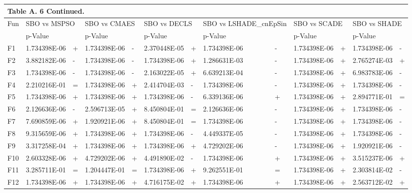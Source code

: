 \documentclass{article} %
\begin{document}
\begin{tabular}{|p{0.3in}|p{0.6in}|p{0.2in}|p{0.6in}|p{0.2in}|p{0.6in}|p{0.2in}|p{0.6in}|p{0.2in}|p{0.6in}|p{0.2in}|p{0.6in}|p{0.2in}|} \hline 
\multicolumn{13}{|p{1in}|}{Table A. 6 Continued.} \\ \hline 
Fun & \multicolumn{2}{|p{0.8in}|}{SBO vs MSPSO} & \multicolumn{2}{|p{0.8in}|}{SBO vs CMAES} & \multicolumn{2}{|p{0.8in}|}{SBO vs DECLS} & \multicolumn{2}{|p{0.8in}|}{SBO vs LSHADE\_cnEpSin} & \multicolumn{2}{|p{0.8in}|}{SBO vs SCADE} & \multicolumn{2}{|p{0.8in}|}{SBO vs SHADE} \\ \hline 
 & p-Value &  & p-Value &  & p-Value &  & p-Value &  & p-Value &  & p-Value &  \\ \hline 
F1 & 1.734398E-06 & + & 1.734398E-06 & - & 2.370448E-05 & + & 1.734398E-06 & - & 1.734398E-06 & + & 1.734398E-06 & - \\ \hline 
F2 & 3.882182E-06 & - & 1.734398E-06 & - & 1.734398E-06 & + & 1.286631E-03 & - & 1.734398E-06 & + & 2.765274E-03 & + \\ \hline 
F3 & 1.734398E-06 & - & 1.734398E-06 & - & 2.163022E-05 & + & 6.639213E-04 & - & 1.734398E-06 & + & 6.983783E-06 & - \\ \hline 
F4 & 2.210216E-01 & = & 1.734398E-06 & + & 2.414704E-03 & - & 1.734398E-06 & - & 1.734398E-06 & + & 1.734398E-06 & - \\ \hline 
F5 & 1.734398E-06 & + & 1.734398E-06 & + & 1.734398E-06 & - & 6.339136E-06 & + & 1.734398E-06 & + & 2.894771E-01 & = \\ \hline 
F6 & 2.126636E-06 & - & 2.596713E-05 & + & 8.450804E-01 & = & 2.126636E-06 & - & 1.734398E-06 & + & 1.734398E-06 & - \\ \hline 
F7 & 7.690859E-06 & + & 1.920921E-06 & + & 8.450804E-01 & = & 1.734398E-06 & - & 1.734398E-06 & + & 1.734398E-06 & - \\ \hline 
F8 & 9.315659E-06 & + & 1.734398E-06 & + & 1.734398E-06 & - & 4.449337E-05 & - & 1.734398E-06 & + & 1.734398E-06 & - \\ \hline 
F9 & 3.317258E-04 & + & 1.734398E-06 & + & 1.734398E-06 & + & 4.729202E-06 & - & 1.734398E-06 & + & 1.920921E-06 & - \\ \hline 
F10 & 2.603328E-06 & + & 4.729202E-06 & + & 4.491890E-02 & - & 1.734398E-06 & + & 1.734398E-06 & + & 3.515237E-06 & + \\ \hline 
F11 & 3.285711E-01 & = & 1.204447E-01 & = & 1.734398E-06 & + & 9.262551E-01 & = & 1.734398E-06 & + & 2.303814E-02 & - \\ \hline 
F12 & 1.734398E-06 & + & 1.734398E-06 & + & 4.716175E-02 & + & 1.734398E-06 & + & 1.734398E-06 & + & 2.563712E-02 & + \\ \hline 

\end{tabular}
\end{document}

